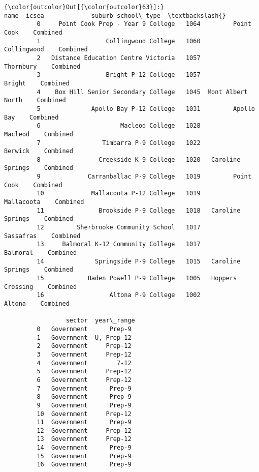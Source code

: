 \documentclass[11pt]{article}
\begin{document}
\begin{Verbatim}[commandchars=\\\{\}]
{\color{outcolor}Out[{\color{outcolor}63}]:}                                   name  icsea             suburb school\_type  \textbackslash{}
         0     Point Cook Prep - Year 9 College   1064         Point Cook    Combined   
         1                  Collingwood College   1060        Collingwood    Combined   
         2   Distance Education Centre Victoria   1057          Thornbury    Combined   
         3                  Bright P-12 College   1057             Bright    Combined   
         4    Box Hill Senior Secondary College   1045  Mont Albert North    Combined   
         5              Apollo Bay P-12 College   1031         Apollo Bay    Combined   
         6                      Macleod College   1028            Macleod    Combined   
         7                 Timbarra P-9 College   1022            Berwick    Combined   
         8                Creekside K-9 College   1020   Caroline Springs    Combined   
         9             Carranballac P-9 College   1019         Point Cook    Combined   
         10             Mallacoota P-12 College   1019         Mallacoota    Combined   
         11               Brookside P-9 College   1018   Caroline Springs    Combined   
         12         Sherbrooke Community School   1017          Sassafras    Combined   
         13     Balmoral K-12 Community College   1017           Balmoral    Combined   
         14              Springside P-9 College   1015   Caroline Springs    Combined   
         15            Baden Powell P-9 College   1005   Hoppers Crossing    Combined   
         16                  Altona P-9 College   1002             Altona    Combined   
         
                 sector  year\_range  
         0   Government      Prep-9  
         1   Government  U, Prep-12  
         2   Government     Prep-12  
         3   Government     Prep-12  
         4   Government        7-12  
         5   Government     Prep-12  
         6   Government     Prep-12  
         7   Government      Prep-9  
         8   Government      Prep-9  
         9   Government      Prep-9  
         10  Government     Prep-12  
         11  Government      Prep-9  
         12  Government     Prep-12  
         13  Government     Prep-12  
         14  Government      Prep-9  
         15  Government      Prep-9  
         16  Government      Prep-9  
\end{Verbatim}
            
\end{document}
